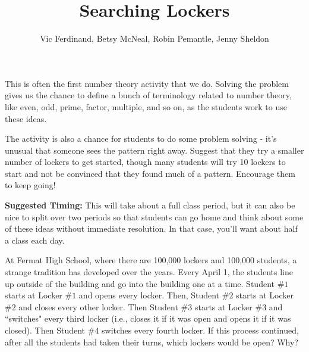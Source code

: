 \documentclass{ximera}
\title{Searching Lockers}
\author{Vic Ferdinand, Betsy McNeal, Robin Pemantle, Jenny Sheldon}
\begin{document}
\begin{abstract} \end{abstract}
\maketitle

\begin{instructorIntro}
This is often the first number theory activity that we do.  Solving the problem gives us the chance to define a bunch of terminology related to number theory, like even, odd, prime, factor, multiple, and so on, as the students work to use these ideas.

The activity is also a chance for students to do some problem solving - it's unusual that someone sees the pattern right away.  Suggest that they try a smaller number of lockers to get started, though many students will try 10 lockers to start and not be convinced that they found much of a pattern.  Encourage them to keep going!

{\bf Suggested Timing:} This will take about a full class period, but it can also be nice to split over two periods so that students can go home and think about some of these ideas without immediate resolution.  In that case, you'll want about half a class each day.
\end{instructorIntro}

At Fermat High School, where there are 100,000 lockers and 100,000 students, a strange tradition has developed over the years.  Every April 1, the students line up outside of the building and go into the building one at a time.  Student $\#1$ starts at Locker $\#1$ and opens every locker.  Then, Student $\#2$ starts at Locker $\#2$  and closes every other locker.  Then Student $\#3$ starts at Locker $\#3$ and ``switches" every third locker (i.e., closes it if it was open and opens it if it was closed).  Then Student $\#4$ switches every fourth locker.  If this process continued, after all the students had taken their turns, which lockers would be open?  Why?
\end{document}
